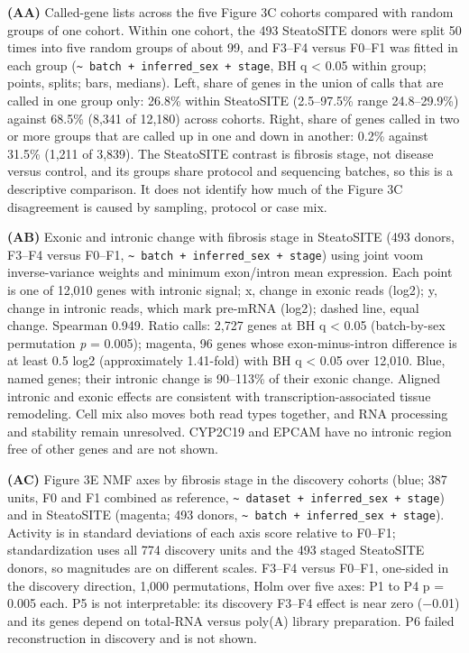 \textbf{(AA)} Called-gene lists across the five Figure 3C cohorts compared with random groups of one cohort. Within one cohort, the 493 SteatoSITE donors were split 50 times into five random groups of about 99, and F3--F4 versus F0--F1 was fitted in each group (\texttt{\textasciitilde{}\ batch\ +\ inferred\_\allowbreak{}sex\ +\ stage}, BH q \textless{} 0.05 within group; points, splits; bars, medians). Left, share of genes in the union of calls that are called in one group only: 26.8\% within SteatoSITE (2.5--97.5\% range 24.8--29.9\%) against 68.5\% (8,341 of 12,180) across cohorts. Right, share of genes called in two or more groups that are called up in one and down in another: 0.2\% against 31.5\% (1,211 of 3,839). The SteatoSITE contrast is fibrosis stage, not disease versus control, and its groups share protocol and sequencing batches, so this is a descriptive comparison. It does not identify how much of the Figure 3C disagreement is caused by sampling, protocol or case mix.

\textbf{(AB)} Exonic and intronic change with fibrosis stage in SteatoSITE (493 donors, F3--F4 versus F0--F1, \texttt{\textasciitilde{}\ batch\ +\ inferred\_\allowbreak{}sex\ +\ stage}) using joint voom inverse-variance weights and minimum exon/intron mean expression. Each point is one of 12,010 genes with intronic signal; x, change in exonic reads (log2); y, change in intronic reads, which mark pre-mRNA (log2); dashed line, equal change. Spearman 0.949. Ratio calls: 2,727 genes at BH q \textless{} 0.05 (batch-by-sex permutation \emph{p} = 0.005); magenta, 96 genes whose exon-minus-intron difference is at least 0.5 log2 (approximately 1.41-fold) with BH q \textless{} 0.05 over 12,010. Blue, named genes; their intronic change is 90--113\% of their exonic change. Aligned intronic and exonic effects are consistent with transcription-associated tissue remodeling. Cell mix also moves both read types together, and RNA processing and stability remain unresolved. CYP2C19 and EPCAM have no intronic region free of other genes and are not shown.

\textbf{(AC)} Figure 3E NMF axes by fibrosis stage in the discovery cohorts (blue; 387 units, F0 and F1 combined as reference, \texttt{\textasciitilde{}\ dataset\ +\ inferred\_\allowbreak{}sex\ +\ stage}) and in SteatoSITE (magenta; 493 donors, \texttt{\textasciitilde{}\ batch\ +\ inferred\_\allowbreak{}sex\ +\ stage}). Activity is in standard deviations of each axis score relative to F0--F1; standardization uses all 774 discovery units and the 493 staged SteatoSITE donors, so magnitudes are on different scales. F3--F4 versus F0--F1, one-sided in the discovery direction, 1,000 permutations, Holm over five axes: P1 to P4 p = 0.005 each. P5 is not interpretable: its discovery F3--F4 effect is near zero (−0.01) and its genes depend on total-RNA versus poly(A) library preparation. P6 failed reconstruction in discovery and is not shown.

